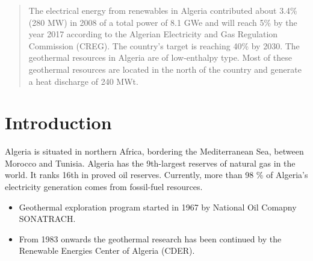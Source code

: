 \documentclass[a0,portrait]{a0poster}
\begin{document}
\vspace{1cm} %


\begin{multicols}{2} %


    \color{Navy} %

    \begin{abstract}
        The electrical energy from renewables in Algeria contributed about 3.4\% (280 MW) in 2008 of a total power of 8.1 GWe and will reach 5\% by the year 2017 according to the Algerian Electricity and Gas Regulation Commission (CREG). The country’s target is reaching 40\% by 2030. The geothermal resources in Algeria are of low-enthalpy type. Most of these geothermal resources are located in the north of the country and generate a heat discharge of 240 MWt.
    \end{abstract}

    \color{Black} %
    \section*{Introduction}
    Algeria is situated in northern Africa, bordering the Mediterranean Sea, between Morocco and Tunisia. Algeria has the 9th-largest reserves of natural gas in the world. It ranks 16th in proved oil reserves. Currently, more than 98 \% of Algeria's electricity generation comes from fossil-fuel resources.
    \begin{itemize}
        \item Geothermal exploration program started in 1967 by National Oil Comapny SONATRACH.
        \item From 1983 onwards the geothermal research has been continued by the Renewable Energies Center of Algeria (CDER).
    \end{itemize}


\end{multicols}
\end{document}
